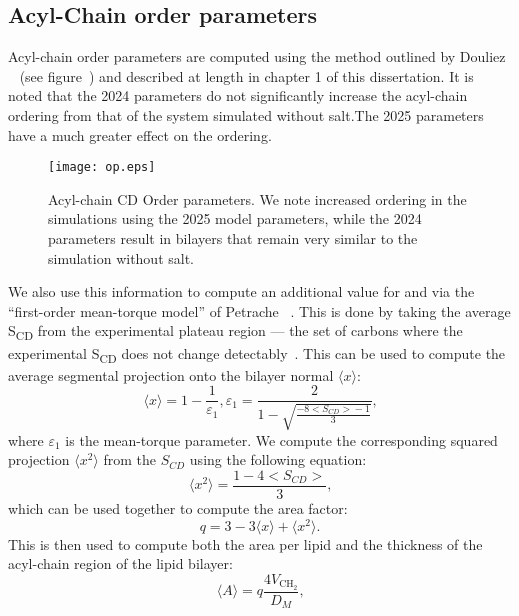 \subsection{Acyl-Chain order parameters}
Acyl-chain order parameters are computed using the method outlined by Douliez \etal~\cite{Douliez:1995} (see  figure~\label{figch4:acylorder}) and described at length in chapter 1 of this dissertation. It is noted 
that the 2024 \mg{} parameters do not significantly increase the acyl-chain ordering from that of the system simulated without salt.The 2025 \mg{} parameters have a much greater effect on the ordering.
\begin{figure}[H]
   \caption[Acyl-Chain order parameters]{Acyl-chain CD Order parameters. We note increased ordering in the
   simulations using the 2025 model parameters, while the 2024 parameters result in
bilayers that remain very similar to the simulation without salt.}
   \label{figch4:acylorder}
   \texttt{[image: op.eps]}
\end{figure}
We also use this information to compute an additional value for \al{} and \dc{} via the ``first-order mean-torque model'' of Petrache \etal~\cite{petrache:2000:nmrarea,nagle:2000}.
This is done by taking the average S\textsubscript{CD} from the experimental plateau region --- the set of carbons where the experimental S\textsubscript{CD} does not change
detectably~\cite{nagle:2000,nagle:1993:nmrarea}. This can be used to compute the average segmental projection onto the bilayer normal $\langle x \rangle$:
\begin{equation}
   \langle x \rangle = 1 - \frac{1}{\varepsilon_1}, \varepsilon_1 = \frac{2}{1 - \sqrt{\frac{-8\big<S_{CD}\big> - 1}{3}}}\text{,}
\end{equation}
where $\varepsilon_1$ is the mean-torque parameter. We compute the corresponding squared projection $\langle x^2 \rangle$ from the $S_{CD}$
using the following equation:
\begin{equation}
   \langle x^2 \rangle = \frac{1 - 4\big<S_{CD}\big>}{3}\text{,}
\end{equation}
which can be used together to compute the area factor:
\begin{equation}
q = 3 - 3 \langle x \rangle + \langle x^2 \rangle\text{.}
\end{equation}
This is then used to compute both the area per lipid and the thickness of the acyl-chain region of the lipid bilayer:
\begin{equation}
   \langle A \rangle = q\frac{4V_{\text{CH}_2}}{D_M}\text{,}
\end{equation}
